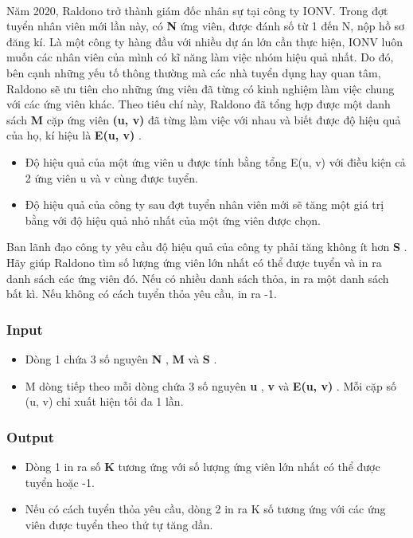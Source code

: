 

 

Năm 2020, Raldono trở thành giám đốc nhân sự tại công ty IONV. Trong đợt tuyển nhân viên mới lần này, có \textbf{ N } ứng viên, được đánh số từ 1 đến N, nộp hồ sơ đăng kí. Là một công ty hàng đầu với nhiều dự án lớn cần thực hiện, IONV luôn muốn các nhân viên của mình có kĩ năng làm việc nhóm hiệu quả nhất. Do đó, bên cạnh những yếu tố thông thường mà các nhà tuyển dụng hay quan tâm, Raldono sẽ ưu tiên cho những ứng viên đã từng có kinh nghiệm làm việc chung với các ứng viên khác. Theo tiêu chí này, Raldono đã tổng hợp được một danh sách \textbf{ M } cặp ứng viên \textbf{ (u, v) } đã từng làm việc với nhau và biết được độ hiệu quả của họ, kí hiệu là \textbf{ E(u, v) } .
\begin{itemize}
	\item Độ hiệu quả của một ứng viên u được tính bằng tổng E(u, v) với điều kiện cả 2 ứng viên u và v cùng được tuyển.
	\item Độ hiệu quả của công ty sau đợt tuyển nhân viên mới sẽ tăng một giá trị bằng với độ hiệu quả nhỏ nhất của một ứng viên được chọn.
\end{itemize}

Ban lãnh đạo công ty yêu cầu độ hiệu quả của công ty phải tăng không ít hơn \textbf{ S } . Hãy giúp Raldono tìm số lượng ứng viên lớn nhất có thể được tuyển và in ra danh sách các ứng viên đó. Nếu có nhiều danh sách thỏa, in ra một danh sách bất kì. Nếu không có cách tuyển thỏa yêu cầu, in ra -1.

\subsubsection{Input}
\begin{itemize}
	\item Dòng 1 chứa 3 số nguyên \textbf{ N } , \textbf{ M } và \textbf{ S } .
	\item M dòng tiếp theo mỗi dòng chứa 3 số nguyên \textbf{ u } , \textbf{ v } và \textbf{ E(u, v) } . Mỗi cặp số (u, v) chỉ xuất hiện tối đa 1 lần.
\end{itemize}

\subsubsection{Output}
\begin{itemize}
	\item Dòng 1 in ra số \textbf{ K } tương ứng với số lượng ứng viên lớn nhất có thể được tuyển hoặc -1.
	\item Nếu có cách tuyển thỏa yêu cầu, dòng 2 in ra K số tương ứng với các ứng viên được tuyển theo thứ tự tăng dần.
\end{itemize}

